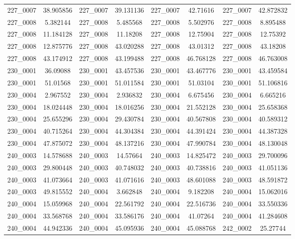 \begin{table}[H]
\begin{tabular}{|c|c|c|c|c|c|c|c|}
        227\_0007 & 38.905856 & 227\_0007 & 39.131136 & 227\_0007 & 42.71616 & 227\_0007 & 42.872832 \\
        227\_0008 & 5.382144 & 227\_0008 & 5.485568 & 227\_0008 & 5.502976 & 227\_0008 & 8.895488 \\
        227\_0008 & 11.184128 & 227\_0008 & 11.18208 & 227\_0008 & 12.75904 & 227\_0008 & 12.75392 \\
        227\_0008 & 12.875776 & 227\_0008 & 43.020288 & 227\_0008 & 43.01312 & 227\_0008 & 43.18208 \\
        227\_0008 & 43.174912 & 227\_0008 & 43.199488 & 227\_0008 & 46.768128 & 227\_0008 & 46.763008 \\
        230\_0001 & 36.09088 & 230\_0001 & 43.457536 & 230\_0001 & 43.467776 & 230\_0001 & 43.459584 \\
        230\_0001 & 51.01568 & 230\_0001 & 51.011584 & 230\_0001 & 51.03104 & 230\_0001 & 51.106816 \\
        230\_0004 & 2.967552 & 230\_0004 & 2.936832 & 230\_0004 & 6.675456 & 230\_0004 & 6.665216 \\
        230\_0004 & 18.024448 & 230\_0004 & 18.016256 & 230\_0004 & 21.552128 & 230\_0004 & 25.658368 \\
        230\_0004 & 25.655296 & 230\_0004 & 29.430784 & 230\_0004 & 40.567808 & 230\_0004 & 40.589312 \\
        230\_0004 & 40.715264 & 230\_0004 & 44.304384 & 230\_0004 & 44.391424 & 230\_0004 & 44.387328 \\
        230\_0004 & 47.875072 & 230\_0004 & 48.137216 & 230\_0004 & 47.990784 & 230\_0004 & 48.130048 \\
        240\_0003 & 14.578688 & 240\_0003 & 14.57664 & 240\_0003 & 14.825472 & 240\_0003 & 29.700096 \\
        240\_0003 & 29.800448 & 240\_0003 & 40.748032 & 240\_0003 & 40.738816 & 240\_0003 & 41.051136 \\
        240\_0003 & 41.073664 & 240\_0003 & 41.071616 & 240\_0003 & 48.601088 & 240\_0003 & 48.591872 \\
        240\_0003 & 49.815552 & 240\_0004 & 3.662848 & 240\_0004 & 9.182208 & 240\_0004 & 15.062016 \\
        240\_0004 & 15.059968 & 240\_0004 & 22.561792 & 240\_0004 & 22.516736 & 240\_0004 & 33.550336 \\
        240\_0004 & 33.568768 & 240\_0004 & 33.586176 & 240\_0004 & 41.07264 & 240\_0004 & 41.284608 \\
        240\_0004 & 44.942336 & 240\_0004 & 45.095936 & 240\_0004 & 45.088768 & 242\_0002 & 25.27744 \\

\end{tabular}
\end{table}
